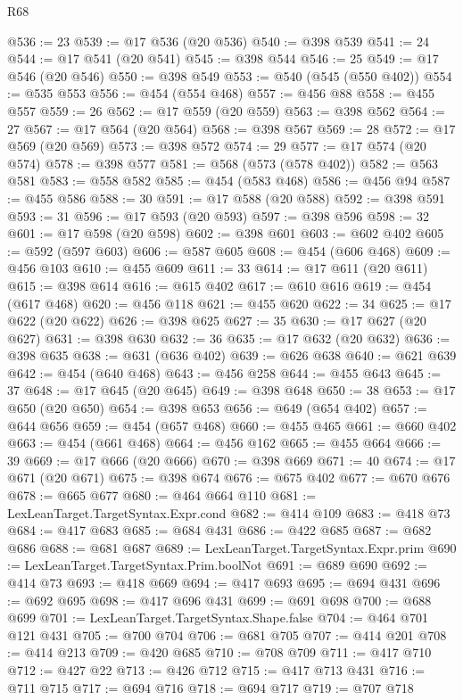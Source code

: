 \begin{lexlean}{R68}
\begin{coremodule}
@536 := 23
@539 := @17 @536 (@20 @536)
@540 := @398 @539
@541 := 24
@544 := @17 @541 (@20 @541)
@545 := @398 @544
@546 := 25
@549 := @17 @546 (@20 @546)
@550 := @398 @549
@553 := @540 (@545 (@550 @402))
@554 := @535 @553
@556 := @454 (@554 @468)
@557 := @456 @88
@558 := @455 @557
@559 := 26
@562 := @17 @559 (@20 @559)
@563 := @398 @562
@564 := 27
@567 := @17 @564 (@20 @564)
@568 := @398 @567
@569 := 28
@572 := @17 @569 (@20 @569)
@573 := @398 @572
@574 := 29
@577 := @17 @574 (@20 @574)
@578 := @398 @577
@581 := @568 (@573 (@578 @402))
@582 := @563 @581
@583 := @558 @582
@585 := @454 (@583 @468)
@586 := @456 @94
@587 := @455 @586
@588 := 30
@591 := @17 @588 (@20 @588)
@592 := @398 @591
@593 := 31
@596 := @17 @593 (@20 @593)
@597 := @398 @596
@598 := 32
@601 := @17 @598 (@20 @598)
@602 := @398 @601
@603 := @602 @402
@605 := @592 (@597 @603)
@606 := @587 @605
@608 := @454 (@606 @468)
@609 := @456 @103
@610 := @455 @609
@611 := 33
@614 := @17 @611 (@20 @611)
@615 := @398 @614
@616 := @615 @402
@617 := @610 @616
@619 := @454 (@617 @468)
@620 := @456 @118
@621 := @455 @620
@622 := 34
@625 := @17 @622 (@20 @622)
@626 := @398 @625
@627 := 35
@630 := @17 @627 (@20 @627)
@631 := @398 @630
@632 := 36
@635 := @17 @632 (@20 @632)
@636 := @398 @635
@638 := @631 (@636 @402)
@639 := @626 @638
@640 := @621 @639
@642 := @454 (@640 @468)
@643 := @456 @258
@644 := @455 @643
@645 := 37
@648 := @17 @645 (@20 @645)
@649 := @398 @648
@650 := 38
@653 := @17 @650 (@20 @650)
@654 := @398 @653
@656 := @649 (@654 @402)
@657 := @644 @656
@659 := @454 (@657 @468)
@660 := @455 @465
@661 := @660 @402
@663 := @454 (@661 @468)
@664 := @456 @162
@665 := @455 @664
@666 := 39
@669 := @17 @666 (@20 @666)
@670 := @398 @669
@671 := 40
@674 := @17 @671 (@20 @671)
@675 := @398 @674
@676 := @675 @402
@677 := @670 @676
@678 := @665 @677
@680 := @464 @664 @110
@681 := LexLeanTarget.TargetSyntax.Expr.cond
@682 := @414 @109
@683 := @418 @73
@684 := @417 @683
@685 := @684 @431
@686 := @422 @685
@687 := @682 @686
@688 := @681 @687
@689 := LexLeanTarget.TargetSyntax.Expr.prim
@690 := LexLeanTarget.TargetSyntax.Prim.boolNot
@691 := @689 @690
@692 := @414 @73
@693 := @418 @669
@694 := @417 @693
@695 := @694 @431
@696 := @692 @695
@698 := @417 @696 @431
@699 := @691 @698
@700 := @688 @699
@701 := LexLeanTarget.TargetSyntax.Shape.false
@704 := @464 @701 @121 @431
@705 := @700 @704
@706 := @681 @705
@707 := @414 @201
@708 := @414 @213
@709 := @420 @685
@710 := @708 @709
@711 := @417 @710
@712 := @427 @22
@713 := @426 @712
@715 := @417 @713 @431
@716 := @711 @715
@717 := @694 @716
@718 := @694 @717
@719 := @707 @718

\end{coremodule}
\end{lexlean}
